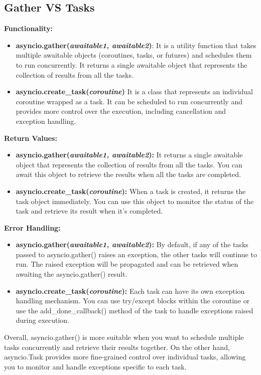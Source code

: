 \documentclass{report}
\begin{document}
    \subsection{Gather VS Tasks}
    \bigbreak \noindent 
    \textbf{Functionality:}
    \begin{itemize}
        \item \textbf{asyncio.gather(\textit{awaitable1, awaitable2})}: It is a utility function that takes multiple awaitable objects (coroutines, tasks, or futures) and schedules them to run concurrently. It returns a single awaitable object that represents the collection of results from all the tasks.
        \item \textbf{asyncio.create\_task(\textit{coroutine})} It is a class that represents an individual coroutine wrapped as a task. It can be scheduled to run concurrently and provides more control over the execution, including cancellation and exception handling.
    \end{itemize}
    \bigbreak \noindent 
    \textbf{Return Values:}
    \begin{itemize}
        \item \textbf{asyncio.gather(\textit{awaitable1, awaitable2}):} It returns a single awaitable object that represents the collection of results from all the tasks. You can await this object to retrieve the results when all the tasks are completed.
        \item \textbf{asyncio.create\_task(\textit{coroutine}):} When a task is created, it returns the task object immediately. You can use this object to monitor the status of the task and retrieve its result when it's completed.
    \end{itemize}
    \bigbreak \noindent 
    \textbf{Error Handling:}
    \begin{itemize}
        \item \textbf{asyncio.gather(\textit{awaitable1, awaitable2}):} By default, if any of the tasks passed to asyncio.gather() raises an exception, the other tasks will continue to run. The raised exception will be propagated and can be retrieved when awaiting the asyncio.gather() result.
        \item \textbf{asyncio.create\_task(\textit{coroutine}):} Each task can have its own exception handling mechanism. You can use try/except blocks within the coroutine or use the add\_done\_callback() method of the task to handle exceptions raised during execution.
    \end{itemize}
    \bigbreak \noindent 
    Overall, asyncio.gather() is more suitable when you want to schedule multiple tasks concurrently and retrieve their results together. On the other hand, asyncio.Task provides more fine-grained control over individual tasks, allowing you to monitor and handle exceptions specific to each task.
\end{document}
